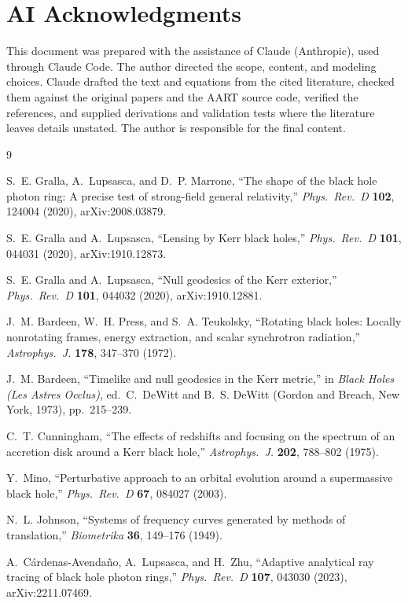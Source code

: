 \documentclass[11pt]{article}
\begin{document}
\section*{AI Acknowledgments}
\label{sec:ai}

This document was prepared with the assistance of Claude (Anthropic), used
through Claude Code. The author directed the scope, content, and modeling
choices. Claude drafted the text and equations from the cited literature,
checked them against the original papers and the AART source code, verified
the references, and supplied derivations and validation tests where the
literature leaves details unstated. The author is responsible for the final
content.

\begin{thebibliography}{9}

S.~E. Gralla, A.~Lupsasca, and D.~P. Marrone,
``The shape of the black hole photon ring: A precise test of strong-field
general relativity,''
\emph{Phys.\ Rev.\ D} \textbf{102}, 124004 (2020), arXiv:2008.03879.

S.~E. Gralla and A.~Lupsasca,
``Lensing by Kerr black holes,''
\emph{Phys.\ Rev.\ D} \textbf{101}, 044031 (2020), arXiv:1910.12873.

S.~E. Gralla and A.~Lupsasca,
``Null geodesics of the Kerr exterior,''
\emph{Phys.\ Rev.\ D} \textbf{101}, 044032 (2020), arXiv:1910.12881.

J.~M. Bardeen, W.~H. Press, and S.~A. Teukolsky,
``Rotating black holes: Locally nonrotating frames, energy extraction, and
scalar synchrotron radiation,''
\emph{Astrophys.\ J.} \textbf{178}, 347--370 (1972).

J.~M. Bardeen, ``Timelike and null geodesics in the Kerr metric,''
in \emph{Black Holes (Les Astres Occlus)},
ed.\ C.~DeWitt and B.~S. DeWitt (Gordon and Breach, New York, 1973),
pp.~215--239.

C.~T. Cunningham,
``The effects of redshifts and focusing on the spectrum of an accretion disk
around a Kerr black hole,''
\emph{Astrophys.\ J.} \textbf{202}, 788--802 (1975).

Y.~Mino,
``Perturbative approach to an orbital evolution around a supermassive black
hole,''
\emph{Phys.\ Rev.\ D} \textbf{67}, 084027 (2003).

N.~L. Johnson,
``Systems of frequency curves generated by methods of translation,''
\emph{Biometrika} \textbf{36}, 149--176 (1949).

A.~C\'ardenas-Avenda\~no, A.~Lupsasca, and H.~Zhu,
``Adaptive analytical ray tracing of black hole photon rings,''
\emph{Phys.\ Rev.\ D} \textbf{107}, 043030 (2023), arXiv:2211.07469.

\end{thebibliography}
\end{document}
